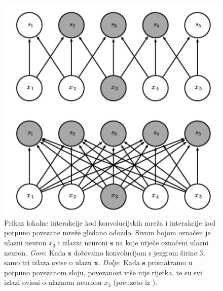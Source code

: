 \documentclass[times, utf8, diplomski]{fer}
\theoremstyle{definition}
\begin{document}
\begin{figure}[!htb]
\centering
\includegraphics[scale=0.24]{lokalna_povezanost_odozdo.png}
\caption{Prikaz lokalne interakcije kod konvolucijskih mreža i interakcije kod potpuno povezane mreže gledano odozdo. Sivom bojom označen je ulazni neuron $x_3$ i izlazni neuroni $\bm{s}$ na koje utječe označeni ulazni neuron. \textit{Gore}: Kada $\bm{s}$ dobivamo konvolucijom s jezgrom širine 3, samo tri izlaza ovise o ulazu $\bm{x}$. \textit{Dolje}: Kada $\bm{s}$ promatramo u potpuno povezanom sloju, povezanost više nije rijetka, te su svi izlazi ovisni o ulaznom neuronu $x_3$ (preuzeto iz \cite{Goodfellow-et-al-2016}).}
\end{figure}
\newpage
\end{document}
